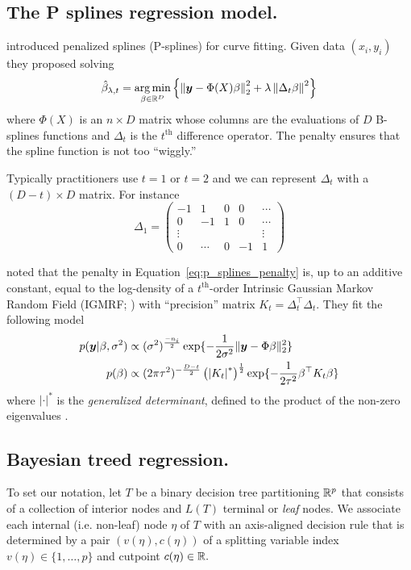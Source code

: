 
\subsection{The P splines regression model.}
\citet{EilersMarx1996} introduced penalized splines (P-splines) for curve fitting.
Given data $(x_{i}, y_{i})$ they proposed solving
\begin{equation}
\label{eq:p_splines_penalty}
\hat{\beta}_{\lambda,t} = \operatorname*{arg\,min}_{\beta \in \mathbb{R}^{D}}\left\{\left\lVert \bm{y} - \Phi(X)\beta \right\rVert_{2}^{2} + \lambda\left\lVert \Delta_{t}\beta \right\rVert^{2} \right\}
\end{equation}
where $\Phi(X)$ is an $n \times D$ matrix whose columns are the evaluations of $D$ B-splines functions and $\Delta_{t}$ is the $t^{\text{th}}$ difference operator.
The penalty ensures that the spline function is not too ``wiggly.''

Typically practitioners use $t = 1$ or $t = 2$ and we can represent $\Delta_{t}$ with a $(D - t) \times D$ matrix.
For instance
$$
\Delta_{1} = 
\begin{pmatrix}
-1 & 1 & 0 & 0 &  \cdots\\
0 & -1 & 1 & 0 & \cdots \\
\vdots & ~ &  ~ & ~ &  \vdots \\
0 & \cdots & 0 & -1 & 1 
\end{pmatrix}
$$


\citet{LangBrezger2004} noted that the penalty in Equation~\eqref{eq:p_splines_penalty} is, up to an additive constant, equal to the log-density of a $t^{\text{th}}$-order Intrinsic Gaussian Markov Random Field (IGMRF; \citet{RueHeld2005}) with ``precision'' matrix $K_{t} = \Delta_{t}^{\top}\Delta_{t}.$
They fit the following model
\begin{align}
p(\bm{y} \vert \beta, \sigma^{2}) &\propto (\sigma^{2})^{\frac{-n_{i}}{2}}\exp\{-\frac{1}{2\sigma^{2}}\Vert \bm{y} - \Phi\beta \rVert_{2}^{2}\} \\
p(\beta) &\propto (2\pi\tau^{2})^{-\frac{D - t}{2}}\left(\left\lvert K_{t} \right\rvert^{*}\right)^{\frac{1}{2}}\exp\{-\frac{1}{2\tau^{2}}\beta^{\top}K_{t}\beta\}
\end{align}
where $\lvert \cdot \rvert^{*}$ is the \textit{generalized determinant}, defined to the product of the non-zero eigenvalues \citep{RueHeld2005}.

\subsection{Bayesian treed regression.}
To set our notation, let $T$ be a binary decision tree partitioning $\mathbb{R}^{p}$ that consists of a collection of interior nodes and $L(T)$ terminal or \emph{leaf} nodes.
We associate each internal (i.e. non-leaf) node $\eta$ of $T$ with an axis-aligned decision rule that is determined by a pair $(v(\eta),c(\eta))$ of a splitting variable index $v(\eta) \in \{1, \ldots, p\}$ and cutpoint $c(\eta) \in \mathbb{R}.$

